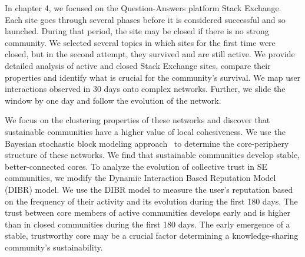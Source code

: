 In chapter 4, we focused on the Question-Answers platform Stack Exchange. Each site goes through several phases before it is considered successful and so launched. During that period, the site may be closed if there is no strong community. We selected several topics in which sites for the first time were closed, but in the second attempt, they survived and are still active. We provide detailed analysis of active and closed Stack Exchange sites, compare their properties and identify what is crucial for the community's survival. We map user interactions observed in 30 days onto complex networks. Further, we slide the window by one day and follow the evolution of the network. 

We focus on the clustering properties of these networks and discover that sustainable communities have a higher value of local cohesiveness. We use the Bayesian stochastic block modeling approach~\cite{gallagher2020clarified} to determine the core-periphery structure of these networks. We find that sustainable communities develop stable, better-connected cores. To analyze the evolution of collective trust in SE communities, we modify the Dynamic Interaction Based Reputation Model~\cite{melnikovDynamicInteractionBasedReputation2018} (DIBR) model. We use the DIBR model to measure the user's reputation based on the frequency of their activity and its evolution during the first 180 days. The trust between core members of active communities develops early and is higher than in closed communities during the first 180 days. The early emergence of a stable, trustworthy core may be a crucial factor determining a knowledge-sharing community's sustainability. 








 

{}\selectfont


	

